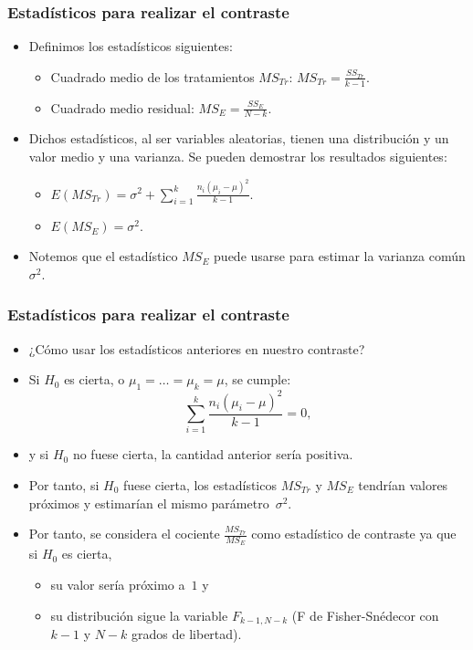 \begin{frame}
\frametitle{Estadísticos para realizar el contraste}
\begin{itemize}
\item<2-> Definimos los estadísticos siguientes:
\begin{itemize}
\item<3-> Cuadrado medio de los tratamientos $MS_{Tr}$: $MS_{Tr}=\frac{SS_{Tr}}{k-1}.$
\item<4-> Cuadrado medio residual: $MS_E=\frac{SS_E}{N-k}.$
\end{itemize}
\item<5-> Dichos estadísticos, al ser variables aleatorias, tienen una distribución y un valor medio y una varianza. Se pueden demostrar los resultados siguientes:
\begin{itemize}
\item<6-> $E(MS_{Tr})=\sigma^2 + \sum\limits_{i=1}^k \frac{n_i (\mu_i -\mu)^2}{k-1}.$
\item<7-> $E(MS_E)=\sigma^2.$
\end{itemize}
\item<8-> Notemos que el estadístico $MS_E$ puede usarse para estimar la varianza común $\sigma^2$.
\end{itemize}
\end{frame}
\begin{frame}
\frametitle{Estadísticos para realizar el contraste}
\begin{itemize}
\item<2-> ¿Cómo usar los estadísticos anteriores en nuestro contraste?
\item<3-> Si $H_0$ es cierta, o $\mu_1=\ldots=\mu_k=\mu$, se cumple:
\[
\sum_{i=1}^k \frac{n_i (\mu_i -\mu)^2}{k-1} = 0,
\]
\item<4-> y si $H_0$ no fuese cierta, la cantidad anterior sería positiva. 
\item<5-> Por tanto, si $H_0$ fuese cierta, los estadísticos $MS_{Tr}$ y $MS_E$ tendrían valores próximos y estimarían el mismo parámetro~$\sigma^2$.
\item<6-> Por tanto, se considera el cociente $\frac{MS_{Tr}}{MS_E}$ como estadístico de contraste ya que si $H_0$ es cierta,
\begin{itemize}
\item<7-> su valor sería próximo a~$1$ y
\item<8-> su distribución sigue la variable $F_{k-1,N-k}$ (F de Fisher-Snédecor con $k-1$ y $N-k$ grados de libertad).
\end{itemize} 
\end{itemize}
\end{frame}
